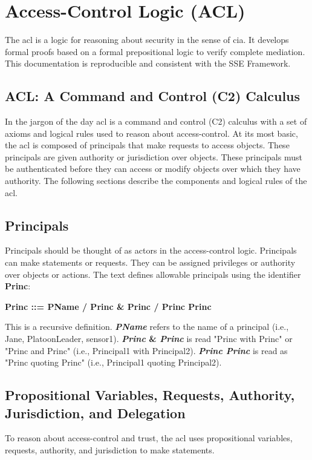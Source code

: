 \documentclass[../../main/main.tex]{subfiles}
\begin{document}
\section{Access-Control Logic (ACL)} \label{sec:acl}
The \gls{acl} is a logic for reasoning about security in the sense of \gls{cia}.  It develops formal proofs based on a formal prepositional logic to verify complete mediation.  This documentation is reproducible and consistent with the SSE Framework.

\subsection{ACL: A Command and Control (C2) Calculus} \label{ssec:aclc2}
In the jargon of the day \gls{acl} is a command and control (C2) calculus with a set of axioms and logical rules used to reason about access-control.  At its most basic, the \gls{acl} is composed of principals that make requests to access objects.  These principals are given authority or jurisdiction over objects.  These principals must be authenticated before they can access or modify objects over which they have authority.  The following sections describe the components and logical rules of the \gls{acl}.

\subsection{Principals}\label{ssec:principals}
Principals should be thought of as actors in the access-control logic.  Principals can make statements or requests.  They can be assigned privileges or authority over objects or actions.  The text defines allowable principals using the identifier \textbf{Princ}:


\begin{center}
\textbf{Princ ::= PName / Princ \& Princ / Princ \textbar  Princ}\label{Princ}
\end{center}

This is a recursive definition. \textbf{\textit{PName}} refers to the name of a principal (i.e., Jane, PlatoonLeader, sensor1).  \textbf{\textit{Princ} \& \textit{Princ}} is read "Princ with Princ" or "Princ and Princ" (i.e., Principal1 with Principal2). \textbf{\textit{Princ \textbar  Princ}} is read as "Princ quoting Princ" (i.e., Principal1 quoting Principal2).


\subsection{Propositional Variables, Requests, Authority, Jurisdiction, and Delegation}\label{ssec:statementsacl}
To reason about access-control and trust, the \gls{acl} uses propositional variables, requests, authority, and jurisdiction to make statements.
\end{document}
